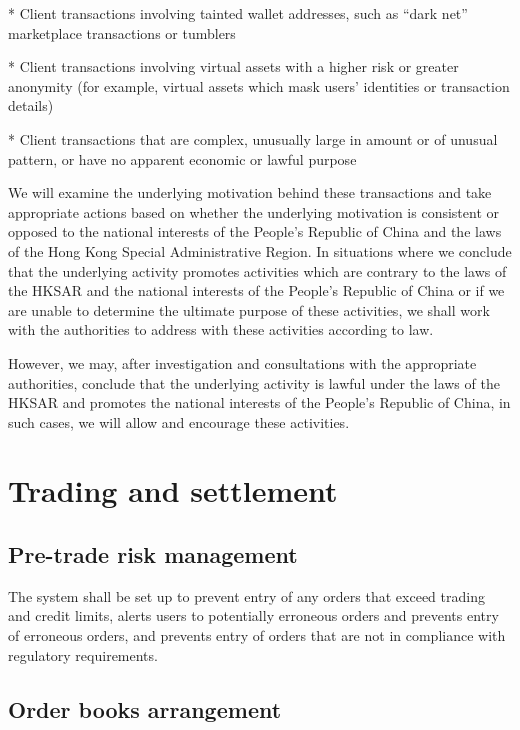 * Client transactions involving tainted wallet addresses, such as
“dark net” marketplace transactions or tumblers

* Client transactions involving virtual assets with a higher risk or
greater anonymity (for example, virtual assets which mask users’
identities or transaction details)

* Client transactions that are complex, unusually large in amount or
of unusual pattern, or have no apparent economic or lawful purpose

We will examine the underlying motivation behind these transactions
and take appropriate actions based on whether the underlying
motivation is consistent or opposed to the national interests of the
People's Republic of China and the laws of the Hong Kong Special
Administrative Region.  In situations where we conclude that the
underlying activity promotes activities which are contrary to the laws
of the HKSAR and the national interests of the People's Republic
of China or if we are unable to determine the ultimate purpose of
these activities, we shall work with the authorities to address with
these activities according to law.

However, we may, after investigation and consultations with the appropriate authorities, conclude that the underlying activity is lawful under the
laws of the HKSAR and promotes the national interests of the People's
Republic of China, in such cases, we will allow and encourage these
activities.

\section{Trading and settlement}
\subsection{Pre-trade risk management}
The system shall be set up to prevent entry of any orders that exceed
trading and credit limits, alerts users to potentially erroneous orders
and prevents entry of erroneous orders, and prevents entry of orders
that are not in compliance with regulatory requirements.

\subsection{Order books arrangement}

